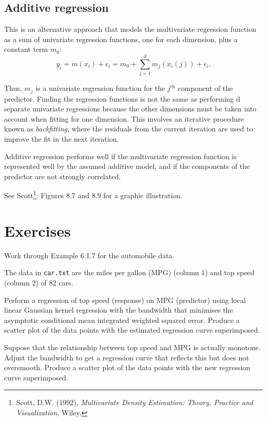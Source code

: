 \subsection{Additive regression}
This is an alternative approach that models the multivariate regression function as a sum of univariate regression functions, one for each dimension, plus a constant term $m_0$:
\begin{equation}
y_i=m(x_i)+\epsilon_i=m_0+\sum^d_{j=1}m_j(x_i(j))+\epsilon_i.
\end{equation}

Thus, $m_j$ is a univariate regression function for the $j^{\textrm{th}}$ component of the predictor. Finding the regression functions is not the same as performing d separate univariate regressions because the other dimensions must be taken into account when fitting for one dimension. This involves an iterative procedure known as {\it backfitting}, where the residuals from the current iteration are used to improve the fit in the next iteration.

Additive regression performs well if the multivariate regression function is represented well by the assumed additive model, and if the components of the predictor are not strongly correlated.

See Scott\footnote{Scott, D.W. (1992), {\it Multivariate Density Estimation: Theory, Practice and Visualization,} Wiley.}: Figures 8.7 and 8.9 for a graphic illustration.

\section{Exercises}
\begin{exercise}
Work through Example 6.1.7 for the automobile data.
\end{exercise}
\begin{exercise}
The data in {\tt car.txt} are the miles per gallon (MPG) (column 1) and top speed (column 2) of 82 cars.
\begin{asparaenum}[(a)]
\item Perform a regression of top speed (response) on MPG (predictor) using local linear Gaussian kernel regression with the bandwidth that minimises the asymptotic conditional mean integrated weighted squared error. Produce a scatter plot of the data points with the estimated regression curve superimposed.
\item Suppose that the relationship between top speed and MPG is actually monotone. Adjust the bandwidth to get a regression curve that reflects this but does not oversmooth. Produce a scatter plot of the data points with the new regression curve superimposed.
\end{asparaenum}
\end{exercise}

